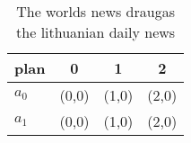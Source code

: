\documentclass[a4paper]{article}
\begin{document}
\begin{table}
\begin{adjustbox}{width=0.6\columnwidth}
\begin{tabular}{|l|l|l|l|}
\hline
\textbf{plan} & \multicolumn{1}{c|}{\textbf{0}} & \multicolumn{1}{c|}{\textbf{1}} & \multicolumn{1}{c|}{\textbf{2}} \\ \hline
\textbf{$a_0$}  & (0,0) & (1,0) & (2,0) \\ \hline
\textbf{$a_1$}  & (0,0) & (1,0) & (2,0) \\ \hline
\end{tabular}
\end{adjustbox}
\caption{The worlds news draugas the lithuanian daily news
}
\end{table}
\end{document}
